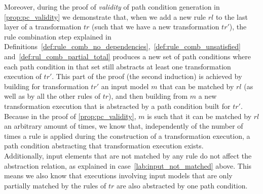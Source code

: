 \begin{pf}
\begin{enumerate}
  Moreover, during the proof of \emph{validity} of path condition generation in \cref{prop:pc_validity} we demonstrate that, when we add a new rule $rl$ to the last layer of a transformation $tr$ (such that we have a new transformation $tr'$), the rule combination step explained in Definitions~\ref{def:rule_comb_no_dependencies},~\ref{def:rule_comb_unsatisfied} and~\ref{def:rul_comb_partial_total} produces a new set of path conditions where each path condition in that set still abstracts at least one transformation execution of $tr'$. This part of the proof (the second induction) is achieved by building for transformation $tr'$ an input model $m$ that can be matched by $rl$ (as well as by all the other rules of $tr$), and then building from $m$ a new transformation execution that is abstracted by a path condition built for $tr'$. Because in the proof of \cref{prop:pc_validity}, $m$ is such that it can be matched by $rl$ an arbitrary amount of times, we know that, independently of the number of times a rule is applied during the construction of a transformation execution, a path condition abstracting that transformation execution exists.\\

Additionally, input elements that are not matched by any rule do not affect the abstraction relation, as explained in case~\ref{lab:input_not_matched} above. This means we also know that executions involving input models that are only partially matched by the rules of $tr$ are also abstracted by one path condition. 
\end{enumerate}


\end{pf}
